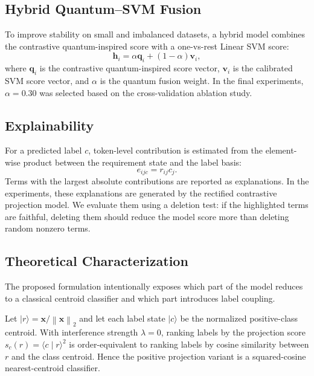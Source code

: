 \documentclass[runningheads]{llncs}
\begin{document}
\subsection{Hybrid Quantum--SVM Fusion}
To improve stability on small and imbalanced datasets, a hybrid model combines
the contrastive quantum-inspired score with a one-vs-rest Linear SVM score:
\begin{equation}
    \mathbf{h}_i = \alpha \mathbf{q}_i + (1-\alpha)\mathbf{v}_i,
\end{equation}
where $\mathbf{q}_i$ is the contrastive quantum-inspired score vector,
$\mathbf{v}_i$ is the calibrated SVM score vector, and $\alpha$ is the quantum
fusion weight. In the final experiments, $\alpha=0.30$ was selected based on
the cross-validation ablation study.

\subsection{Explainability}
For a predicted label $c$, token-level contribution is estimated from the
element-wise product between the requirement state and the label basis:
\begin{equation}
    e_{ijc} = r_{ij}c_j.
\end{equation}
Terms with the largest absolute contributions are reported as explanations. In
the experiments, these explanations are generated by the rectified contrastive
projection model. We evaluate them using a deletion test: if the highlighted
terms are faithful, deleting them should reduce the model score more than
deleting random nonzero terms.

\subsection{Theoretical Characterization}
The proposed formulation intentionally exposes which part of the model reduces
to a classical centroid classifier and which part introduces label coupling.

\begin{proposition}
\label{prop:reduction}
Let $\lvert r\rangle = \mathbf{x}/\left\|\mathbf{x}\right\|_2$ and let each
label state $\lvert c\rangle$ be the normalized positive-class centroid. With
interference strength $\lambda=0$, ranking labels by the projection score
$s_c(r)=\langle c\mid r\rangle^2$ is order-equivalent to ranking labels by
cosine similarity between $r$ and the class centroid. Hence the positive
projection variant is a squared-cosine nearest-centroid classifier.
\end{proposition}
\end{document}
